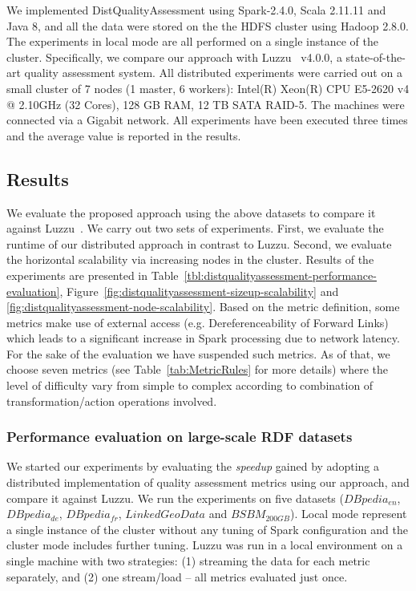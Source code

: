 We implemented DistQualityAssessment using Spark-2.4.0, Scala 2.11.11 and Java 8, and all the data were stored on the the \gls{HDFS} cluster using Hadoop 2.8.0.
The experiments in local mode are all performed on a single instance of the cluster.
Specifically, we compare our approach with Luzzu~\cite{debattista2016luzzu} v4.0.0, a state-of-the-art quality assessment system.
All distributed experiments were carried out on a small cluster of 7 nodes (1 master, 6 workers): Intel(R) Xeon(R) CPU E5-2620 v4 @ 2.10GHz (32 Cores), 128 GB RAM, 12 TB SATA RAID-5.
The machines were connected via a Gigabit network.
All experiments have been executed three times and the average value is reported in the results.

\subsection{Results}

We evaluate the proposed approach using the above datasets to compare it against Luzzu~\cite{debattista2016luzzu}.
We carry out two sets of experiments.
First, we evaluate the runtime of our distributed approach in contrast to Luzzu.
Second, we evaluate the horizontal scalability via increasing nodes in the cluster.
Results of the experiments are presented in Table~\ref{tbl:distqualityassessment-performance-evaluation}, Figure~\ref{fig:distqualityassessment-sizeup-scalability} and
\ref{fig:distqualityassessment-node-scalability}.
Based on the metric definition, some metrics make use of external access (e.g. Dereferenceability of Forward Links) which leads to a significant increase in Spark processing due to network latency. 
For the sake of the evaluation we have suspended such metrics.
As of that, we choose seven metrics (see Table~\ref{tab:MetricRules} for more details) where the level of difficulty vary from simple to complex according to combination of transformation/action operations involved.

\subsubsection{Performance evaluation on large-scale RDF datasets}
\label{subsubsection:distqualityassessment-large_scale_datasets}

We started our experiments by evaluating the \textit{speedup} gained by adopting a distributed implementation of quality assessment metrics using our approach, and compare it against Luzzu.
We run the experiments on five datasets
($DBpedia_{en}$, $DBpedia_{de}$, $DBpedia_{fr}$, $LinkedGeoData$ and $BSBM_{200GB}$).
Local mode represent a single instance of the cluster without any tuning of Spark configuration and the cluster mode includes further tuning.
Luzzu was run in a local environment on a single machine with two strategies: (1) streaming the data for each metric separately, and (2) one stream/load -- all metrics evaluated just once. 


